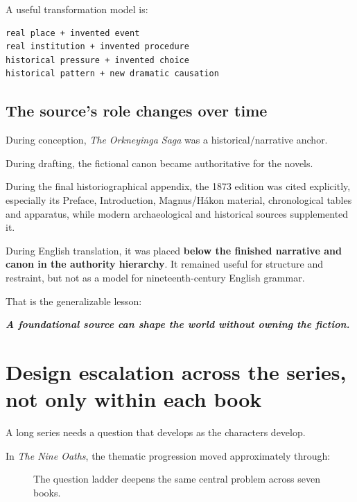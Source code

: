 \documentclass[11pt,oneside,openany]{book}
\renewenvironment{quote}{\begin{insightbox}\itshape}{\end{insightbox}}
\begin{document}
A useful transformation model is:

\begin{lstlisting}
real place + invented event
real institution + invented procedure
historical pressure + invented choice
historical pattern + new dramatic causation
\end{lstlisting}

\section{The source's role changes over time}\label{the-sources-role-changes-over-time}

During conception, \emph{The Orkneyinga Saga} was a historical/narrative anchor.

During drafting, the fictional canon became authoritative for the novels.

During the final historiographical appendix, the 1873 edition was cited explicitly, especially its Preface, Introduction, Magnus/Hákon material, chronological tables and apparatus, while modern archaeological and historical sources supplemented it.

During English translation, it was placed \textbf{below the finished narrative and canon in the authority hierarchy}. It remained useful for structure and restraint, but not as a model for nineteenth-century English grammar.

That is the generalizable lesson:

\begin{quote}
\textbf{A foundational source can shape the world without owning the fiction.}

\end{quote}

\chapter{Design escalation across the series, not only within each book}

A long series needs a question that develops as the characters develop.

In \emph{The Nine Oaths}, the thematic progression moved approximately through:

\begin{figure}[htbp]
\centering
{}
\caption{The question ladder deepens the same central problem across seven books.}
\end{figure}
\end{document}
